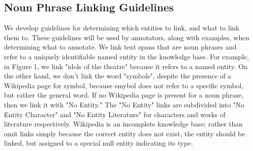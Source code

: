 \subsection{Noun Phrase Linking Guidelines}
We develop guidelines for determining which entities to link, and what to link them to. 
These guidelines will be used by annotators, along with examples, when determining what to annotate. 
We link text spans that are noun phrases and refer to a uniquely identifiable named entity in the knowledge base. 
For example, in Figure 1, we link "idols of the theatre" because it refers to a named entity. 
On the other hand, we don't link the word "symbols", despite the presence of a Wikipedia page for symbol, because smybol does not refer to a specific symbol, but rather the general word. 
If no Wikipedia page is present for a noun phrase, then we link it with "No Entity."
The "No Entity" links are subdivided into "No Entity Character" and "No Entity Literature" for characters and works of literature respectively.
Wikipedia is an incomplete knowledge base; rather than omit links simply because the correct entity does not exist, the entity should be linked, but assigned to a special null entity indicating its type. 



